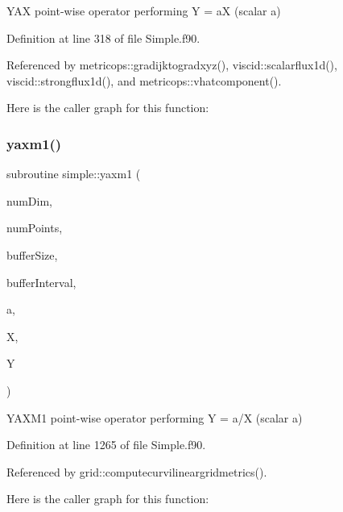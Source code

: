 Y\+AX point-\/wise operator performing Y = aX (scalar a) 



Definition at line 318 of file Simple.\+f90.



Referenced by metricops\+::gradijktogradxyz(), viscid\+::scalarflux1d(), viscid\+::strongflux1d(), and metricops\+::vhatcomponent().

Here is the caller graph for this function\+:
\hypertarget{namespacesimple_a11e2072409fc7bf72ea7abf6b32a6859}{}\label{namespacesimple_a11e2072409fc7bf72ea7abf6b32a6859} 
\subsubsection{\texorpdfstring{yaxm1()}{yaxm1()}}
{\footnotesize\ttfamily subroutine simple\+::yaxm1 (\begin{DoxyParamCaption}\item[{integer(kind=4), intent(in)}]{num\+Dim,  }\item[{integer(kind=8), intent(in)}]{num\+Points,  }\item[{integer(kind=8), dimension(numdim), intent(in)}]{buffer\+Size,  }\item[{integer(kind=8), dimension(2$\ast$numdim), intent(in)}]{buffer\+Interval,  }\item[{real(kind=8), intent(in)}]{a,  }\item[{real(kind=8), dimension(numpoints), intent(inout)}]{X,  }\item[{real(kind=8), dimension(numpoints), intent(inout)}]{Y }\end{DoxyParamCaption})}



Y\+A\+X\+M1 point-\/wise operator performing Y = a/X (scalar a) 



Definition at line 1265 of file Simple.\+f90.



Referenced by grid\+::computecurvilineargridmetrics().

Here is the caller graph for this function\+:
\hypertarget{namespacesimple_a9fda7399c7066c6d02cc076f833db738}{}\label{namespacesimple_a9fda7399c7066c6d02cc076f833db738} 
